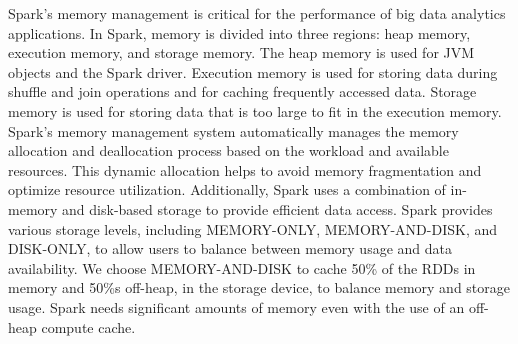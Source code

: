 \documentclass[twocolumn,10pt]{asme2e}
\begin{document}
Spark's memory management is critical for the performance of big data analytics applications. In Spark, memory is divided into three regions: heap memory, execution memory, and storage memory. The heap memory is used for JVM objects and the Spark driver. Execution memory is used for storing data during shuffle and join operations and for caching frequently accessed data. Storage memory is used for storing data that is too large to fit in the execution memory. Spark's memory management system automatically manages the memory allocation and deallocation process based on the workload and available resources. This dynamic allocation helps to avoid memory fragmentation and optimize resource utilization. Additionally, Spark uses a combination of in-memory and disk-based storage to provide efficient data access. Spark provides various storage levels, including MEMORY-ONLY, MEMORY-AND-DISK, and DISK-ONLY, to allow users to balance between memory usage and data availability. We choose MEMORY-AND-DISK to cache 50\% of the RDDs in memory and 50\%s off-heap, in the storage device, to balance memory and storage usage. Spark needs significant amounts of memory even with the use of an off-heap compute cache.
\end{document}
